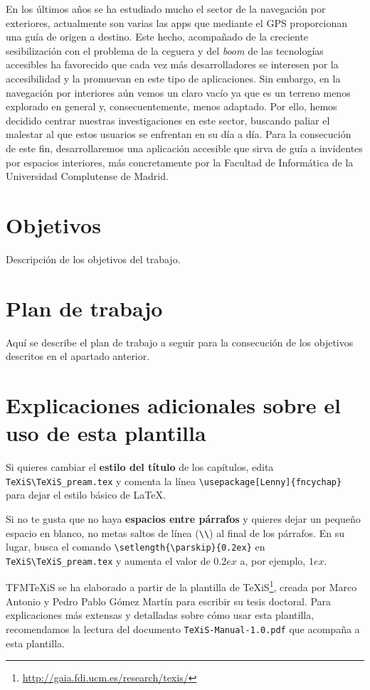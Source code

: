 En los últimos años se ha estudiado mucho el sector de la navegación por exteriores, actualmente son varias las apps que mediante el GPS proporcionan una guía de origen a destino. Este hecho, acompañado de la creciente sesibilización con el problema de la ceguera y del \textit{boom} de las tecnologías accesibles ha favorecido que cada vez más desarrolladores se interesen por la accesibilidad y la promuevan en este tipo de aplicaciones. Sin embargo, en la navegación por interiores aún vemos un claro vacío ya que es un terreno menos explorado en general y, consecuentemente, menos adaptado. Por ello, hemos decidido centrar nuestras investigaciones en este sector, buscando paliar el malestar al que estos usuarios se enfrentan en su día a día. Para la consecución de este fin, desarrollaremos una aplicación accesible que sirva de guía a invidentes por espacios interiores, más concretamente por la Facultad de Informática de la Universidad Complutense de Madrid.




\section{Objetivos}

Descripción de los objetivos del trabajo.


\section{Plan de trabajo}
Aquí se describe el plan de trabajo a seguir para la consecución de los objetivos descritos en el apartado anterior.



\section{Explicaciones adicionales sobre el uso de esta plantilla}
Si quieres cambiar el \textbf{estilo del título} de los capítulos, edita \verb|TeXiS\TeXiS_pream.tex| y comenta la línea \verb|\usepackage[Lenny]{fncychap}| para dejar el estilo básico de \LaTeX.

Si no te gusta que no haya \textbf{espacios entre párrafos} y quieres dejar un pequeño espacio en blanco, no metas saltos de línea (\verb|\\|) al final de los párrafos. En su lugar, busca el comando  \verb|\setlength{\parskip}{0.2ex}| en \verb|TeXiS\TeXiS_pream.tex| y aumenta el valor de $0.2ex$ a, por ejemplo, $1ex$.

TFMTeXiS se ha elaborado a partir de la plantilla de TeXiS\footnote{\url{http://gaia.fdi.ucm.es/research/texis/}}, creada por Marco Antonio y Pedro Pablo Gómez Martín para escribir su tesis doctoral. Para explicaciones más extensas y detalladas sobre cómo usar esta plantilla, recomendamos la lectura del documento \texttt{TeXiS-Manual-1.0.pdf} que acompaña a esta plantilla.

